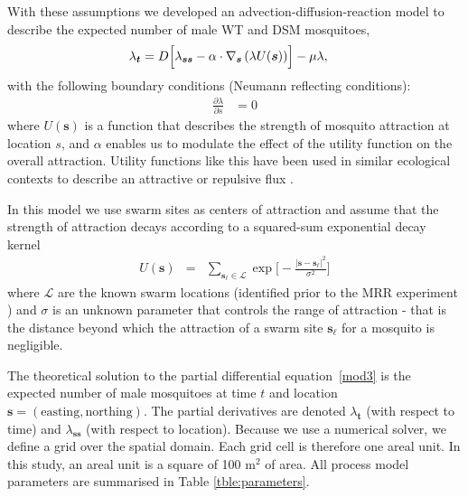 \documentclass[]{bmcart}
\newcommand{\vt}{\bm{t}}
\newcommand{\vs}{\bm{s}}
\newcommand{\va}{{\alpha}}
\newcommand{\vd}{{D}}
\newcommand{\vm}{{\mu}}
\begin{document}
With these assumptions we developed an advection-diffusion-reaction model to describe the expected number of male WT and DSM mosquitoes,
\begin{align}
\lambda_{\vt} &= \vd \Bigl[ \lambda_{\vs \vs}-\va \cdot \nabla_{\vs} \left( \lambda U(\vs)\right) \Bigr]-\vm \lambda, \label{mod3}
\end{align}
with the following boundary conditions (Neumann reflecting conditions):
\begin{align}
\frac{\partial \lambda}{\partial s} &= 0
\end{align}
where $U(\vs)$ is a function that describes the strength of mosquito attraction at location $s$, and $\va$ enables us to modulate the effect of the utility function on the overall attraction. Utility functions like this have been used in similar ecological contexts to describe an attractive or repulsive flux \citep{Moorcroft2008}.

In this model we use swarm sites as centers of attraction and assume that the strength of attraction decays according to a squared-sum exponential decay kernel
\begin{eqnarray}
U(\vs) &=& \sum_{\vs_\ell \in \mathcal{L}} \exp\Big[  - \frac{|\vs - \vs_\ell |^2}{\sigma^2}\Big]
\end{eqnarray}
where $\mathcal{L}$ are the known swarm locations (identified prior to the MRR experiment \citep{Epopa2017}) and $\sigma$ is an unknown parameter that controls the range of attraction - that is the distance beyond which the attraction of a swarm site $\vs_\ell$ for a mosquito is negligible. 

The theoretical solution to the partial differential equation~\ref{mod3} is the expected number of male mosquitoes at time $t$ and location $\vs=(\mathrm{easting},\mathrm{northing})$. The partial derivatives are denoted $\lambda_{\vt}$ (with respect to time) and $\lambda_{\vs \vs}$ (with respect to location). Because we use a numerical solver, we define a grid over the spatial domain. Each grid cell is therefore one areal unit. In this study, an areal unit is a square of 100 m$^2$ of area. All process model parameters are summarised in Table \ref{tble:parameters}.
\end{document}
